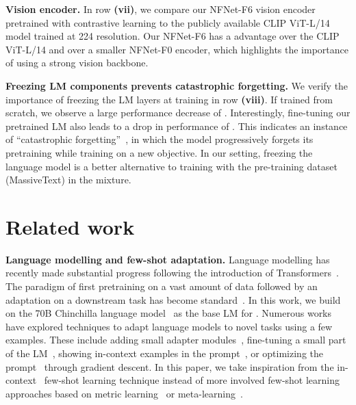 \noindent
\textbf{Vision encoder.}
In row \textbf{(vii)}, we compare our NFNet-F6 vision encoder pretrained with contrastive learning  to the publicly available CLIP ViT-L/14~\citep{clip} model trained at 224 resolution.
Our NFNet-F6 has a  advantage over the CLIP ViT-L/14 and  over a smaller NFNet-F0 encoder, which highlights the importance of using a strong vision backbone.

\noindent
\textbf{Freezing LM components prevents catastrophic forgetting.} We verify the importance of freezing the LM layers at training in row \textbf{(viii)}.
If trained from scratch, we observe a large performance decrease of .
Interestingly, fine-tuning our pretrained LM also leads to a drop in performance of .
This indicates an instance of ``catastrophic forgetting''~\citep{mccloskey1989catastrophic}, in which the model progressively forgets its pretraining while training on a new objective. In our setting, freezing the language model is a better alternative to training with the pre-training dataset (MassiveText) in the mixture.


\section{Related work}

\textbf{Language modelling and few-shot adaptation.}
Language modelling has recently made substantial progress following the introduction of Transformers~\citep{vaswani2017attention}.
The paradigm of first pretraining on a vast amount of data followed by an adaptation on a downstream task has become standard~\citep{mikolov2010recurrent,graves2013generating,jozefowicz2016exploring,howard2018universal,bert,t5,sutskever2011generating,gpt3}.
In this work, we build on the 70B Chinchilla language model~\citep{chinchilla} as the base LM for \largem{}.
Numerous works have explored techniques to adapt language models to novel tasks using a few examples.
These include adding small adapter modules~\citep{houlsby2019parameter}, fine-tuning a small part of the LM~\citep{zaken_bitfit_2022}, showing in-context examples in the prompt~\citep{gpt3}, or optimizing the prompt~\citep{li2021prefix,lester2021power} through gradient descent.
In this paper, we take inspiration from the in-context~\citep{gpt3} few-shot learning technique instead of more involved few-shot learning approaches based on metric learning~\citep{doersch2020crosstransformers,vinyals2016matching,snell2017prototypical,tian2020rethinking} or meta-learning~\citep{finn2017model,bertinetto2018meta,zintgraf2019fast,requeima2019fast,gordon2018meta,bertinetto2016learning}.

